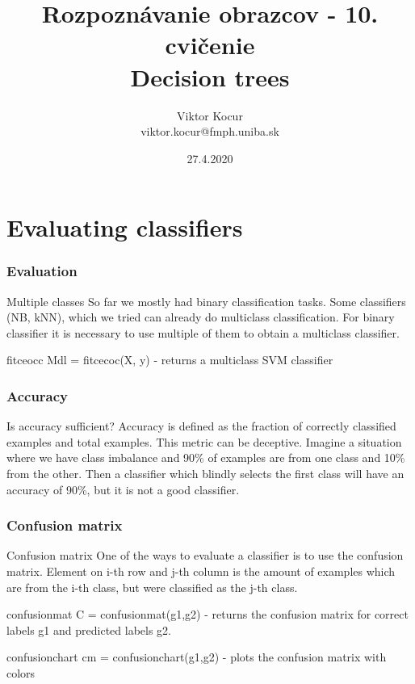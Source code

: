 \documentclass{beamer}
\title[Stromy]{Rozpoznávanie obrazcov - 10. cvičenie \\ Decision trees}
\author[Viktor Kocur]{Viktor Kocur \\{\small viktor.kocur@fmph.uniba.sk}}
\institute{DAI FMFI UK}
\date{27.4.2020}
\begin{document}

\begin{frame}[plain]
  \titlepage  
\end{frame}



\section{Evaluating classifiers}
\begin{frame}
\frametitle{Evaluation}
  \begin{block}{Multiple classes}
  So far we mostly had binary classification tasks. Some classifiers (NB, kNN), which we tried can already do multiclass classification. For binary classifier it is necessary to use multiple of them to obtain a multiclass classifier.
  
  \end{block}   
  
  \begin{block}{fitceocc}
  Mdl = fitcecoc(X, y) - returns a multiclass SVM classifier
  \end{block}   


\end{frame}


\begin{frame}
\frametitle{Accuracy}
\begin{block}{Is accuracy sufficient?}
Accuracy is defined as the fraction of correctly classified examples and total examples. This metric can be deceptive. Imagine a situation where we have class imbalance and 90\% of examples are from one class and 10\% from the other. Then a classifier which blindly selects the first class will have an accuracy of 90\%, but it is not a good classifier.
\end{block}
\end{frame}


\begin{frame}
\frametitle{Confusion matrix}
  \begin{block}{Confusion matrix}
  One of the ways to evaluate a classifier is to use the confusion matrix. Element on i-th row and j-th column is the amount of examples which are from the i-th class, but were classified as the j-th class. 
  \end{block}   

  \begin{block}{confusionmat}
  C = confusionmat(g1,g2) - returns the confusion matrix for correct labels g1 and predicted labels g2.
  \end{block} 
    
  \begin{block}{confusionchart}
  cm = confusionchart(g1,g2) - plots the confusion matrix with colors
  \end{block}         
\end{frame}
\end{document}
